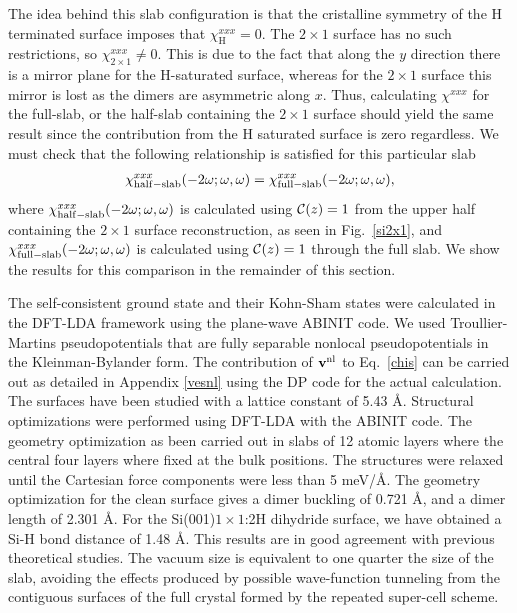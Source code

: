 \documentclass[floatfix,prb,aps,superscriptaddress,showpacs,11pt,preprint,letterpaper]{revtex4}
\begin{document}
The idea behind this slab configuration is that the 
cristalline symmetry of the H terminated surface imposes that 
$\chi_{\mathrm{H}}^{xxx}=0$.
 The $2\times 1$ surface has no 
such restrictions, so $\chi_{2\times 1}^{xxx}\ne 0$.
This is due to the fact that along the $y$ direction there is a mirror plane for the
H-saturated surface, whereas 
for the $2\times 1$ surface this mirror is lost as the dimers are
asymmetric along $x$. 
Thus, calculating $\chi^{xxx}$ for the full-slab, or the 
half-slab containing the $2\times 1$ surface\cite{note1}
should yield the same result since the contribution from the H
saturated surface is zero regardless. 
We must check that the following 
relationship is satisfied for this particular slab
\begin{align}\label{hs}
\chi_{\mathrm{half-slab}}^{xxx}(-2\omega;\omega,\omega) 
=
\chi_{\mathrm{full-slab}}^{xxx}(-2\omega;\omega,\omega) 
,
\end{align}
where
$\chi_{\mathrm{half-slab}}^{xxx}(-2\omega;\omega,\omega)$ is calculated using
${\mathbf{\cal C}}(z)=1$ from the upper half containing the $2\times 1$ 
surface reconstruction, as seen in Fig.~\ref{si2x1},
and $\chi_{\mathrm{full-slab}}^{xxx}(-2\omega;\omega,\omega)$ is calculated using
${\mathbf{\cal C}}(z)=1$ through the full slab.
We show the results for this comparison in the remainder 
of this section.


The self-consistent ground state and their Kohn-Sham states were
calculated in the DFT-LDA framework using the plane-wave 
ABINIT code.\cite{abinit}
We used Troullier-Martins pseudopotentials\cite{troullierPRB91} that are 
fully separable nonlocal pseudopotentials in the Kleinman-Bylander 
form.\cite{kleinmanPRL82}
The contribution of $\mathbf{v}^{\mathrm{nl}}$ to Eq.~\eqref{chis} can be carried out 
as detailed in Appendix \ref{vesnl} using the DP code for 
the actual calculation.\cite{francesco}
%
The surfaces have been studied with a lattice constant of 5.43 \AA. 
Structural optimizations were performed using DFT-LDA
with the ABINIT code.\cite{abinit}  
The geometry optimization as been carried out in slabs of 12
atomic layers where the central four layers where fixed at the bulk
positions.  
The structures were relaxed until the Cartesian force components were less than 5 meV/\AA. 
The geometry optimization for the clean surface gives
a dimer buckling of 0.721 \AA, and a dimer length of 2.301 \AA.  
For the  Si(001)$1\times 1$:2H dihydride surface, we have obtained a Si-H bond distance of 1.48 \AA. 
This results are in good agreement with previous 
theoretical studies.\cite{caramellaPRB09,mendozaPRB06}
The vacuum size is equivalent to one quarter the
size of the slab, avoiding the effects produced by possible 
wave-function tunneling from the contiguous surfaces of the full
crystal formed by the repeated super-cell scheme.\cite{mendozaPRB06}    
\end{document}
